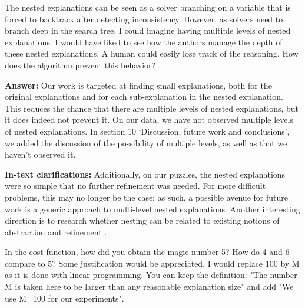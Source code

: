 \documentclass{article}
\newcommand\comment[1]{\marginpar{\tiny #1}}
\renewcommand\comment[1]{#1}
\newcommand{\tias}[1]{{\comment{\color{blue}\textsc{TG:}#1}}}
\newcommand{\answer}[1]{{\comment{\textbf{Answer:} #1}}}
\newcommand{\clarification}[1]{{\comment{\textbf{In-text clarifications:} #1}}}
\newcommand{\bart}[1]{{\comment{\color{green} \textsc{BB:}#1}}}
\begin{document}
\begin{quoteit}
The nested explanations can be seen as a solver branching on a variable that is forced to backtrack after detecting inconsistency. However, as solvers need to branch deep in the search tree, I could imagine having multiple levels of nested explanations. I would have liked to see how the authors manage the depth of these nested explanations. A human could easily lose track of the reasoning. How does the algorithm prevent this behavior?
\end{quoteit}

\answer{Our work is targeted at finding small explanations, both for the original explanations and for each sub-explanation in the nested explanation. This reduces the chance that there are multiple levels of nested explanations, but it does indeed not prevent it. On our data, we have not observed multiple levels of nested explanations. In section 10 `Discussion, future work and conclusions', we added the discussion of the possibility of multiple levels, as well as that we haven't observed it.} 

\clarification{Additionally, on our puzzles,  the nested explanations were so simple that no further refinement was needed. 
	For more difficult problems, this may no longer be the case; as such, a possible avenue for future work is a generic approach to multi-level nested explanations. 
	Another interesting direction is to research whether nesting can be related to existing notions of abstraction and refinement \cite{leuschel2005automatic, saribatur2019abstraction, mitchell2008expressive}.}

\begin{quoteit}
In the cost function, how did you obtain the magic number 5? How do 4 and 6 compare to 5? Some justification would be appreciated. 
I would replace 100 by M as it is done with linear programming. You can keep the definition: "The number M is taken here to be larger than any reasonable explanation size" and add "We use M=100 for our experiments".
\end{quoteit}
\end{document}
